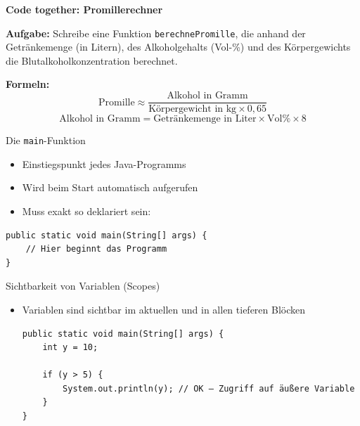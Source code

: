 \documentclass{../../presentation}
\begin{document}
\begin{frame}[plain]
	\centering
	{\Huge\bfseries Code together: Promillerechner}

	\vspace{1em}

	\begin{flushleft}
		\textbf{Aufgabe:} Schreibe eine Funktion \texttt{berechnePromille}, die anhand der Getränkemenge (in Litern),
		des Alkoholgehalts (Vol-\%) und des Körpergewichts die Blutalkoholkonzentration berechnet.

		\vspace{1em}

		\textbf{Formeln:}
		\[
			\text{Promille} \approx \frac{\text{Alkohol in Gramm}}{\text{Körpergewicht in kg} \times 0{,}65}
		\]
		\[
			\text{Alkohol in Gramm} = \text{Getränkemenge in Liter} \times \text{Vol\%} \times 8
		\]
	\end{flushleft}
\end{frame}

\begin{frame}[fragile]{Die \texttt{main}-Funktion}
	\begin{itemize}
		\item\pause Einstiegspunkt jedes Java-Programms
		\item\pause Wird beim Start automatisch aufgerufen
		\item\pause Muss exakt so deklariert sein:
	\end{itemize}

	\vspace{0.5em}

	\begin{verbatim}
public static void main(String[] args) {
    // Hier beginnt das Programm
}
\end{verbatim}
\end{frame}

\begin{frame}[fragile]{Sichtbarkeit von Variablen (Scopes)}
	\begin{itemize}
		\item\pause Variablen sind sichtbar im aktuellen und in allen tieferen Blöcken
		      \begin{verbatim}
public static void main(String[] args) {
    int y = 10;

    if (y > 5) {
        System.out.println(y); // OK – Zugriff auf äußere Variable
    }
}
    \end{verbatim}
	\end{itemize}
\end{frame}
\end{document}

